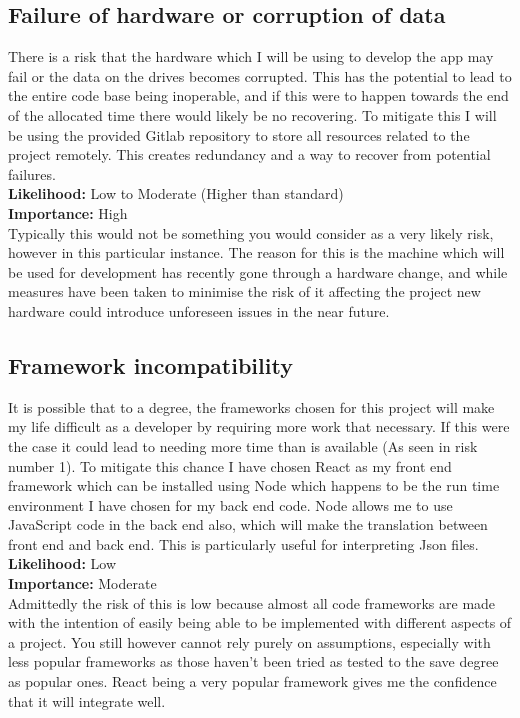 \documentclass{article}
\begin{document}
\subsection{Failure of hardware or corruption of data}
There is a risk that the hardware which I will be using to develop the app may fail or the data on the drives becomes corrupted. This has the potential to lead to the entire code base being inoperable, and if this were to happen towards the end of the allocated time there would likely be no recovering. To mitigate this I will be using the provided Gitlab repository to store all resources related to the project remotely. This creates redundancy and a way to recover from potential failures.\\

\noindent
\textbf{Likelihood:} Low to Moderate (Higher than standard)\\
\textbf{Importance:} High\\

\noindent
Typically this would not be something you would consider as a very likely risk, however in this particular instance. The reason for this is the machine which will be used for development has recently gone through a hardware change, and while measures have been taken to minimise the risk of it affecting the project new hardware could introduce unforeseen issues in the near future.

\subsection{Framework incompatibility}
It is possible that to a degree, the frameworks chosen for this project will make my life difficult as a developer by requiring more work that necessary. If this were the case it could lead to needing more time than is available (As seen in risk number 1). To mitigate this chance I have chosen React as my front end framework which can be installed using Node which happens to be the run time environment I have chosen for my back end code. Node allows me to use JavaScript code in the back end also, which will make the translation between front end and back end. This is particularly useful for interpreting Json files.\\

\noindent
\textbf{Likelihood:} Low\\
\textbf{Importance:} Moderate\\

\noindent
Admittedly the risk of this is low because almost all code frameworks are made with the intention of easily being able to be implemented with different aspects of a project. You still however cannot rely purely on assumptions, especially with less popular frameworks as those haven't been tried as tested to the save degree as popular ones. React being a very popular framework gives me the confidence that it will integrate well.
\end{document}

